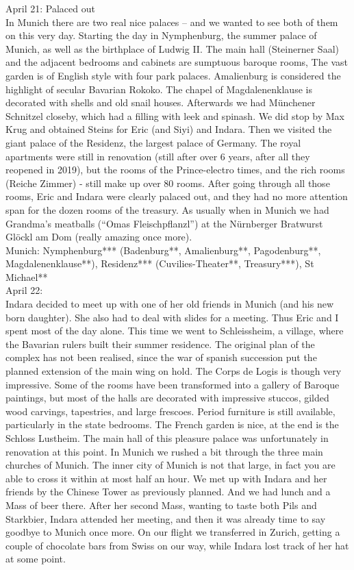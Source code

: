 April 21: Palaced out\\
In Munich there are two real nice palaces -- and we wanted to see both of them on this very day. Starting the day in Nymphenburg, the summer palace of Munich, as well as the birthplace of Ludwig II. The main hall (Steinerner Saal) and the adjacent bedrooms and cabinets are sumptuous baroque rooms, The vast garden is of English style with four park palaces. Amalienburg is considered the highlight of secular Bavarian Rokoko. The chapel of Magdalenenklause is decorated with shells and old snail houses. Afterwards we had M\"unchener Schnitzel closeby, which had a filling with leek and spinash. We did stop by Max Krug and obtained Steins for Eric (and Siyi) and Indara. Then we visited the giant palace of the Residenz, the largest palace of Germany. The royal apartments were still in renovation (still after over 6 years, after all they reopened in 2019), but the rooms of the Prince-electro times, and the rich rooms (Reiche Zimmer) - still make up over 80 rooms. After going through all those rooms, Eric and Indara were clearly palaced out, and they had no more attention span for the dozen rooms of the treasury. As usually when in Munich we had Grandma's meatballs (``Omas Fleischpflanzl'') at the N\"urnberger Bratwurst Gl\"ockl am Dom (really amazing once more).\\

Munich: Nymphenburg*** (Badenburg**, Amalienburg**, Pagodenburg**, Magdalenenklause**), Residenz*** (Cuvilies-Theater**, Treasury***), St Michael**\\

April 22:\\
Indara decided to meet up with one of her old friends in Munich (and his new born daughter). She also had to deal with slides for a meeting. Thus Eric and I spent most of the day alone. This time we went to Schleissheim, a village, where the Bavarian rulers built their summer residence.  The original plan of the complex has not been realised, since the war of spanish succession put the planned extension of the main wing on hold. The Corps de Logis is though very impressive. Some of the rooms have been transformed into a gallery of Baroque paintings, but most of the halls are decorated with impressive stuccos, gilded wood carvings, tapestries, and large frescoes. Period furniture is still available, particularly in the state bedrooms. The French garden is nice, at the end is the Schloss Lustheim. The main hall of this pleasure palace was unfortunately in renovation at this point. In Munich we rushed a bit through the three main churches of Munich. The inner city of Munich is not that large, in fact you are able to cross it within at most half an hour. We met up with Indara and her friends by the Chinese Tower as previously planned. And we had lunch and a Mass of beer there. After her second Mass, wanting to taste both Pils and Starkbier, Indara attended her meeting, and then it was already time to say goodbye to Munich once more. On our flight we transferred in Zurich, getting a couple of chocolate bars from Swiss on our way, while Indara lost track of her hat at some point.\\

